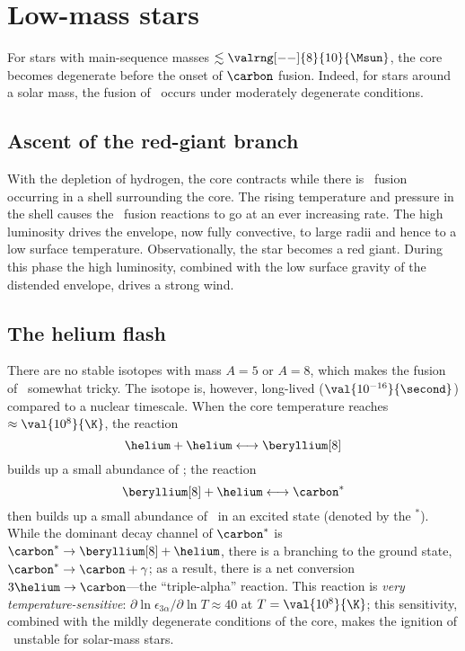 
\section{Low-mass stars}
For stars with main-sequence masses $\lesssim \valrng[--]{8}{10}{\Msun}$, the core becomes degenerate before the onset of $\carbon$ fusion.  Indeed, for stars around a solar mass, the fusion of \helium\ occurs under moderately degenerate conditions.

\subsection{Ascent of the red-giant branch}
With the depletion of hydrogen, the core contracts while there is \hydrogen\ fusion occurring in a shell surrounding the core.  The rising temperature and pressure in the shell causes the \hydrogen\ fusion reactions to go at an ever increasing rate.  The high luminosity drives the envelope, now fully convective, to large radii and hence to a low surface temperature. Observationally, the star becomes a red giant.  During this phase the high luminosity, combined with the low surface gravity of the distended envelope, drives a strong wind.

\subsection{The helium flash}
There are no stable isotopes with mass $A=5$ or $A=8$, which makes the fusion of \helium\ somewhat tricky.  The isotope \beryllium[8] is, however, long-lived ($\val{10^{-16}}{\second}$) compared to a nuclear timescale.
When the core temperature reaches $\approx\val{10^{8}}{\K}$, the reaction
\[ \helium + \helium \longleftrightarrow\beryllium[8] \]
builds up a small abundance of \beryllium[8]; the reaction
\[ \beryllium[8] + \helium \longleftrightarrow \carbon^{*} \]
then builds up a small abundance of \carbon\ in an excited state (denoted by the $^{*}$).  While the dominant decay channel of $\carbon^{*}$ is $\carbon^{*}\to\beryllium[8]+\helium$, there is a branching to the ground state, $\carbon^{*}\to\carbon+\gamma$; as a result, there is a net conversion $3\helium\to\carbon$---the ``triple-alpha'' reaction.  This reaction is \emph{very temperature-sensitive}: $\partial\ln\epsilon_{3\alpha}/\partial\ln T \approx 40$ at $T = \val{10^{8}}{\K}$; this sensitivity, combined with the mildly degenerate conditions of the core, makes the ignition of \helium\ unstable for solar-mass stars.

